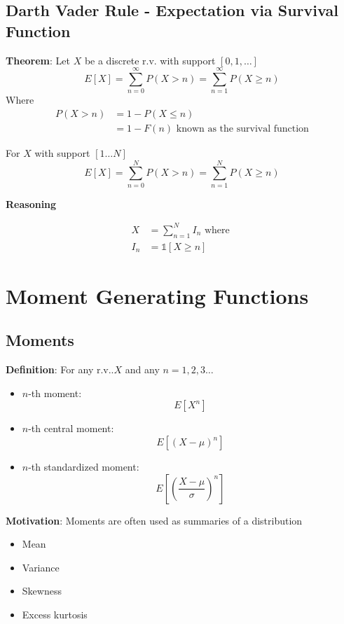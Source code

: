 \section{Darth Vader Rule - Expectation via Survival Function}

\begin{framed}
   \textbf{Theorem}: Let $X$ be a discrete r.v. with support $[0, 1, \hdots ] $ 
   \[
      E[X] = \sum_{n = 0}^{\infty} P(X > n)  = \sum_{n = 1}^{\infty} P(X \geq n)
   \] 
   Where 
   \begin{align*}
      P(X > n) &= 1 - P(X \leq n) \\
               &= 1 - F(n)  \text{ known as the survival function}
   \end{align*}

   For $X$ with support $[1 \hdots N]$
    \[
       E[X] = \sum_{n = 0}^{N} P(X > n) = \sum_{n=1}^{N} P(X \geq n)
   \] 

   \textbf{Reasoning}

   \begin{align*}
      X &= \sum_{n=1}^{N} I_n \text{ where }  \\
      I_n &= \mathbb{1}[X \geq n]
   \end{align*}
\end{framed}







\chapter{Moment Generating Functions}

\section{Moments}
\begin{framed}
   \textbf{Definition}: For any r.v..$X$ and any $n = 1, 2, 3 \hdots$
    \begin{itemize}
       \item $n$-th moment: 
          \[
             E[X^n]
          \] 
       \item $n$-th central moment: 
          \[
             E[(X - \mu)^n]
          \] 
       \item $n$-th standardized moment: 
          \[
             E \left[( \frac{X - \mu}{\sigma})^n \right]
          \] 
   \end{itemize}

   \textbf{Motivation}: Moments are often used as summaries of a distribution
   \begin{itemize}
      \item Mean
      \item Variance
      \item Skewness
      \item Excess kurtosis
   \end{itemize}
\end{framed}

